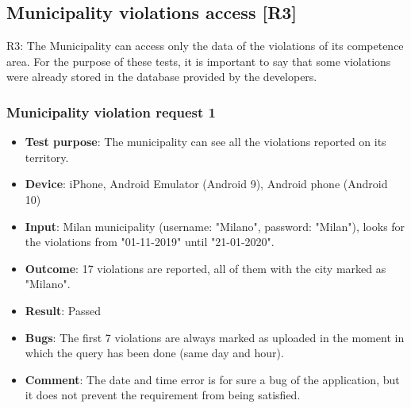 \documentclass[../ATD.tex]{subfiles}
\begin{document}
    \subsection{Municipality violations access [R3]}\label{subsec:municipality-report-access}
    R3: The Municipality can access only the data of the violations of its competence area.
    \newline
    For the purpose of these tests, it is important to say that some violations were already stored in the database provided by the developers.
    \subsubsection{Municipality violation request 1}\label{subsubsec:municiplaity-violation-request-1}
    \begin{itemize}
        \item \textbf{Test purpose}: The municipality can see all the violations reported on its territory.
        \item \textbf{Device}: iPhone, Android Emulator (Android 9), Android phone (Android 10)
        \item \textbf{Input}: Milan municipality (username: "Milano", password: "Milan"), looks for the violations from "01-11-2019" until "21-01-2020".
        \item \textbf{Outcome}: 17 violations are reported, all of them with the city marked as "Milano".
        \item \textbf{Result}: Passed
        \item \textbf{Bugs}: The first 7 violations are always marked as uploaded in the moment in which the query has been done (same day and hour).
        \item \textbf{Comment}: The date and time error is for sure a bug of the application, but it does not prevent the requirement from being satisfied.
    \end{itemize}
\end{document}
